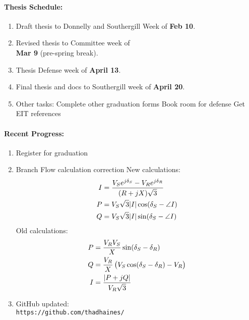\documentclass[12pt]{article}
\begin{document}
\begin{multicols}{2}
\raggedright
	\paragraph{Thesis Schedule:}
	\begin{enumerate}
\itemsep0em 
		\item Draft thesis to Donnelly and Southergill Week of\textbf{ Feb 10}.
		\item Revised thesis to Committee week of \\ \textbf{Mar 9} (pre-spring break).
		\item Thesis Defense week of \textbf{April 13}.
		\item Final thesis and docs to Southergill week of \textbf{April 20}.
\item Other tasks:
\subitem Complete other graduation forms
\subitem Book room for defense
\subitem Get EIT references
\end{enumerate}

	\paragraph{Recent Progress:}
	\begin{enumerate}
\itemsep0em 

\item Register for graduation
\item Branch Flow calculation correction
\subitem New calculations: \\
\begin{align}
	I &= \dfrac{ V_S e^{j\delta_S}-V_R e^{j\delta_R}}{ (R+jX)\sqrt{3}}\\
	P &= V_S \sqrt{3} \abs{I} \cos(\delta_S -\angle{I}) \\
	Q &= V_S \sqrt{3} \abs{I} \sin(\delta_S -\angle{I}) 
\end{align}
\subitem Old calculations: \\
\begin{align}
P &= \dfrac{V_R V_S}{X} \sin(\delta_S - \delta_R)\\
Q &= \dfrac{V_R}{X} \left(V_S\cos(\delta_S - \delta_R)-V_R\right)\\
I &= \dfrac{\abs{P + jQ}}{V_R\sqrt{3}}
\end{align}

		
		
		\item GitHub updated:\\
		\verb|https://github.com/thadhaines/|



\end{enumerate}
\end{multicols}
\end{document}
